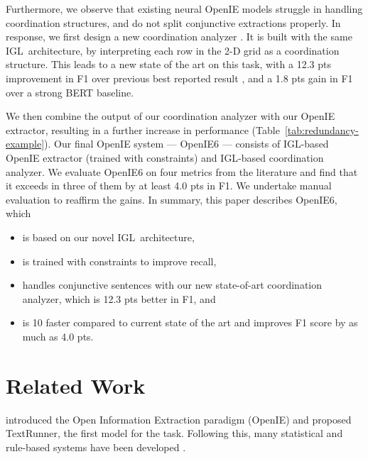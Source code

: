 \documentclass[11pt,a4paper]{article}
\newcommand{\shortname}{{\scshape IGL}}
\begin{document}
Furthermore, we observe that existing neural OpenIE models struggle in handling coordination structures, and do not split conjunctive extractions properly.  In response, we first design a new coordination analyzer \cite{ficler&goldberg16b}. It is built with the same \shortname\ architecture, by interpreting each row in the 2-D grid as a coordination structure. This leads to a new state of the art on this task, with a 12.3 pts improvement in F1 over previous best reported result \cite{teranishi+19}, and a 1.8 pts gain in F1 over a strong BERT baseline. 




We then combine the output of our coordination analyzer with our OpenIE extractor, resulting in a further increase in performance (Table~\ref{tab:redundancy-example}). 
Our final OpenIE system --- OpenIE6 --- consists of \shortname-based OpenIE extractor (trained with constraints) and \shortname-based coordination analyzer. We evaluate OpenIE6 on four metrics from the literature and find that it exceeds in three of them by at least 4.0 pts in F1. We undertake manual evaluation to reaffirm the gains. In summary, this paper describes OpenIE6, which
\begin{itemize}
    \item is based on our novel \shortname\  architecture,
    \item is trained with constraints to improve recall,
    \item handles conjunctive sentences with our new state-of-art coordination analyzer, which is 12.3 pts better in F1, and
    \item is 10 faster compared to current state of the art and improves F1 score by as much as 4.0 pts.
\end{itemize}























 
\section{Related Work}
\label{sec:related}
\citet{banko&al07} introduced the Open Information Extraction  paradigm (OpenIE) and proposed TextRunner, the first model for the task. Following this, many statistical and rule-based systems have been developed  \cite{Fader&al11,etzioni-ijcai11, christensen&al11, Mausam&al12,  corro&al13, angeli&al15, pal&al16, Stanovsky&al2016, saha&al2017,  gashteovski&al17,  saha&mausam18, christina&al18}. 
\end{document}
